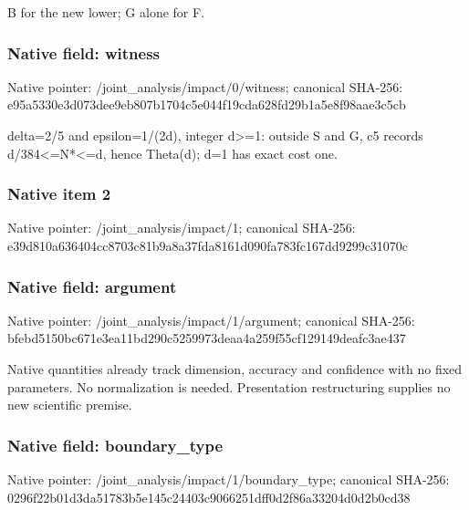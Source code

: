 \documentclass[10pt,a4paper]{article}
\begin{document}
\begingroup\raggedright\sloppy B for the new lower;\allowbreak{} G alone for F.\par\endgroup

\subsubsection{Native field: witness}
Native pointer: /joint\_\allowbreak{}analysis/impact/0/witness; canonical SHA-256: e95a5330e3d073dee9eb807b1704c5e044f19cda628fd29b1a5e8f98aae3c5cb

\begingroup\raggedright\sloppy delta=\allowbreak{}2/\allowbreak{}5 and epsilon=\allowbreak{}1/\allowbreak{}(2d),\allowbreak{} integer d>=\allowbreak{}1:\allowbreak{} outside S and G,\allowbreak{} c5 records d/\allowbreak{}384<=\allowbreak{}N*<=\allowbreak{}d,\allowbreak{} hence Theta(d);\allowbreak{} d=\allowbreak{}1 has exact cost one.\par\endgroup

\subsubsection{Native item 2}
Native pointer: /joint\_\allowbreak{}analysis/impact/1; canonical SHA-256: e39d810a636404cc8703c81b9a8a37fda8161d090fa783fc167dd9299c31070c

\subsubsection{Native field: argument}
Native pointer: /joint\_\allowbreak{}analysis/impact/1/argument; canonical SHA-256: bfebd5150bc671e3ea11bd290c5259973deaa4a259f55cf129149deafc3ae437

\begingroup\raggedright\sloppy Native quantities already track dimension,\allowbreak{} accuracy and confidence with no fixed parameters. No normalization is needed. Presentation restructuring supplies no new scientific premise.\par\endgroup

\subsubsection{Native field: boundary\_\allowbreak{}type}
Native pointer: /joint\_\allowbreak{}analysis/impact/1/boundary\_\allowbreak{}type; canonical SHA-256: 0296f22b01d3da51783b5e145c24403c9066251dff0d2f86a33204d0d2b0cd38
\end{document}
